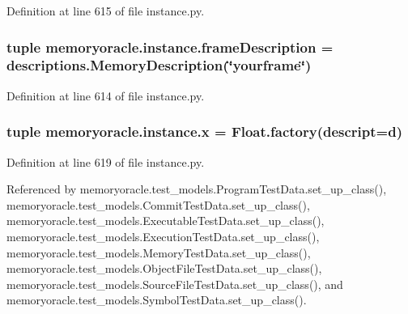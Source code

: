 Definition at line 615 of file instance.\+py.

\hypertarget{namespacememoryoracle_1_1instance_ab71eabd3bbc314043bb5a1313cc3ab75}{}
\subsubsection[{frame\+Description}]{\setlength{\rightskip}{0pt plus 5cm}tuple memoryoracle.\+instance.\+frame\+Description = {\bf descriptions.\+Memory\+Description}(\char`\"{}yourframe\char`\"{})}\label{namespacememoryoracle_1_1instance_ab71eabd3bbc314043bb5a1313cc3ab75}


Definition at line 614 of file instance.\+py.

\hypertarget{namespacememoryoracle_1_1instance_afe036cc8dc71469743d090c4c80d50c5}{}
\subsubsection[{x}]{\setlength{\rightskip}{0pt plus 5cm}tuple memoryoracle.\+instance.\+x = {\bf Float.\+factory}(descript={\bf d})}\label{namespacememoryoracle_1_1instance_afe036cc8dc71469743d090c4c80d50c5}


Definition at line 619 of file instance.\+py.



Referenced by memoryoracle.\+test\+\_\+models.\+Program\+Test\+Data.\+set\+\_\+up\+\_\+class(), memoryoracle.\+test\+\_\+models.\+Commit\+Test\+Data.\+set\+\_\+up\+\_\+class(), memoryoracle.\+test\+\_\+models.\+Executable\+Test\+Data.\+set\+\_\+up\+\_\+class(), memoryoracle.\+test\+\_\+models.\+Execution\+Test\+Data.\+set\+\_\+up\+\_\+class(), memoryoracle.\+test\+\_\+models.\+Memory\+Test\+Data.\+set\+\_\+up\+\_\+class(), memoryoracle.\+test\+\_\+models.\+Object\+File\+Test\+Data.\+set\+\_\+up\+\_\+class(), memoryoracle.\+test\+\_\+models.\+Source\+File\+Test\+Data.\+set\+\_\+up\+\_\+class(), and memoryoracle.\+test\+\_\+models.\+Symbol\+Test\+Data.\+set\+\_\+up\+\_\+class().

